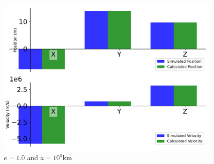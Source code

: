 \begin{figure}[htbp]\centerline{\includegraphics[height=0.7\textwidth, keepaspectratio]{AutoTeX/IncPara_1}}\caption{$e = 1.0$ and $a = 10^0$km}\label{fig:IncPara_1}\end{figure}